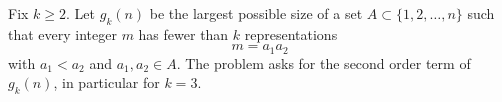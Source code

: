 Fix $k\ge 2$. Let $g_k(n)$ be the largest possible size of a set $A\subset\{1,2,\dots,n\}$ such that every integer $m$ has fewer than $k$ representations
\[
 m=a_1a_2
\]
with $a_1<a_2$ and $a_1,a_2\in A$.
The problem asks for the second order term of $g_k(n)$, in particular for $k=3$.
